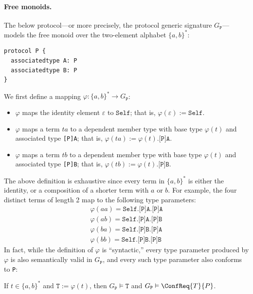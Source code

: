 \documentclass[../generics]{subfiles}
\begin{document}
\paragraph{Free monoids.} The below protocol---or more precisely, the protocol generic signature $G_\texttt{P}$---models the free monoid over the two-element alphabet $\{a,b\}^*$:
\begin{Verbatim}
protocol P {
  associatedtype A: P
  associatedtype B: P
}
\end{Verbatim}
We first define a mapping $\varphi\colon\{a,b\}^*\rightarrow G_\texttt{P}$:
\begin{itemize}
\item $\varphi$ maps the identity element $\varepsilon$ to $\texttt{Self}$; that is, $\varphi(\varepsilon):=\texttt{Self}$.
\item $\varphi$ maps a term $ta$ to a dependent member type with base type $\varphi(t)$ and associated type \texttt{[P]A}; that is, $\varphi(ta):=\texttt{$\varphi(t)$.[P]A}$.
\item $\varphi$ maps a term $tb$ to a dependent member type with base type $\varphi(t)$ and associated type \texttt{[P]B}; that is, $\varphi(tb):=\texttt{$\varphi(t)$.[P]B}$.
\end{itemize}
The above definition is exhaustive since every term in $\{a,b\}^*$ is either the identity, or a composition of a shorter term with $a$ or $b$. For example, the four distinct terms of length 2 map to the following type parameters:
\begin{gather*}
\varphi(aa)=\texttt{Self.[P]A.[P]A}\\
\varphi(ab)=\texttt{Self.[P]A.[P]B}\\
\varphi(ba)=\texttt{Self.[P]B.[P]A}\\
\varphi(bb)=\texttt{Self.[P]B.[P]B}
\end{gather*}
In fact, while the definition of $\varphi$ is ``syntactic,'' every type parameter produced by $\varphi$ is also semantically valid in $G_\texttt{P}$, and every such type parameter also conforms to \texttt{P}:
\begin{proposition}\label{monoid type lemma} If $t\in \{a,b\}^*$ and $\texttt{T}:=\varphi(t)$, then $G_\texttt{P}\vDash\texttt{T}$ and $G_\texttt{P}\vDash\ConfReq{T}{P}$.
\end{proposition}
\end{document}
